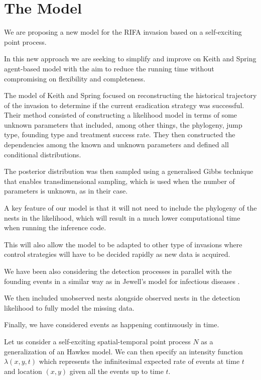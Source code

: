 \documentclass[11pt,a4paper]{article}
\begin{document}
\section{The Model}

We are proposing a new model for the RIFA invasion based on a self-exciting point process.

In this new approach we are seeking to simplify and improve on Keith and Spring agent-based model \cite{Keith} with the aim to reduce the running time without compromising on flexibility and completeness.

The model of Keith and Spring focused on reconstructing the historical trajectory of the invasion to determine if the current eradication strategy was successful. Their method consisted of constructing a likelihood model in terms of some unknown parameters that included, among other things, the phylogeny, jump type, founding type and treatment success rate. They then constructed the dependencies among the known and unknown parameters and defined all conditional distributions.

The posterior distribution was then sampled using a generalised Gibbs technique that enables transdimensional sampling, which is used when the number of parameters is unknown, as in their case.

A key feature of our model is that it will not need to include the phylogeny of the nests in the likelihood, which will result in a much lower computational time when running the inference code.

This will also allow the model to be adapted to other type of invasions where control strategies will have to be decided rapidly as new data is acquired.

We have been also considering the detection processes in parallel with the founding events in a similar way as in Jewell's model for infectious diseases \cite{Jewell}.

We then included unobserved nests alongside observed nests in the detection likelihood to fully model the missing data.

Finally, we have considered events as happening continuously in time.

Let us consider a self-exciting spatial-temporal point process $N$ as a generalization of an Hawkes model. We can then specify an intensity function $\lambda(x, y, t)$ which represents the infinitesimal expected  rate of events at time $t$ and location $(x, y)$  given all the events up to time $t$.
\end{document}
